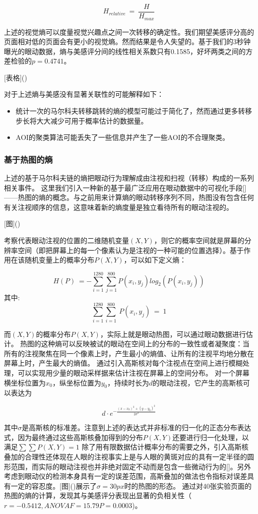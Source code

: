 $$H_{relative}~=~\frac{H}{H_{max}}$$

上述的视觉熵可以度量视觉兴趣点之间一次转移的确定性。我们期望美感评分高的页面相对低的页面会有更小的视觉熵。然而结果是令人失望的。基于我们的3秒钟曝光的眼动数据，熵与美感评分间的线性相关系数只有0.1585，好坏两类之间的方差检验的$p=0.4741$。

[表格]()

对于上述熵与美感没有显著关联性的可能解释如下：

\begin{itemize}
  \item 统计一次的马尔科夫转移跳转的熵的模型可能过于简化了，然而通过更多转移步长将大大减少可用于概率估计的数据量。
  \item AOI的聚类算法可能丢失了一些信息并产生了一些AOI的不合理聚类。
\end{itemize}

\subsubsection{基于热图的熵}
上述的基于马尔科夫链的熵把眼动行为理解成由注视和扫视（转移）构成的一系列相关事件。
这里我们引入一种新的基于最广泛应用在眼动数据中的可视化手段[]——热图的熵的概念。与之前用来计算熵的眼动转移序列不同，热图没有包含任何有关注视顺序的信息，这意味着新的熵度量是独立看待所有的眼动注视的。

[图]()

考察代表眼动注视的位置的二维随机变量$(X, Y)$，则它的概率空间就是屏幕的分辨率空间（即把屏幕上的每一个像素认为是注视的一种可能的位置选择）。基于作用在该随机变量上的概率分布$P(X, Y)$，可以如下定义熵：

$$H(P)~=-\sum_{i=1}^{1280} \sum_{j=1}^{800} P(x_i, y_j)log_2(P(x_i, y_j))$$
其中: $$\sum_{i=1}^{1280}\sum_{i=1}^{800}~P(x_i, y_j)~=~1$$

而$(X, Y)$的概率分布$P(X, Y)$，实际上就是眼动热图，可以通过眼动数据进行估计。
热图的这种熵可以反映被试的眼动在空间上的分布的一致性或者凝聚度：当所有的注视聚焦在同一个像素上时，产生最小的熵值、让所有的注视平均地分散在屏幕上时，产生最大的熵值。
通过引入高斯核对每个注视点在空间上进行模糊处理，可以实现用少量的眼动采样据来估计注视在屏幕上的空间分布。
对一个屏幕横坐标位置为$x_0$，纵坐标位置为$y_0$，持续时长为$d$的眼动注视，它产生的高斯核可以表达为

$$d\cdot e^{-\frac{(x-x_0)^2 + (y-y_0)^2}{2\sigma^2}}$$

其中$\sigma$是高斯核的标准差。注意到上述的表达式并非标准的归一化的正态分布表达式，因为最终通过这些高斯核叠加得到的分布$P(X, Y)$还要进行归一化处理，以满足$\sum\sum P(X, Y) = 1$
除了用有限数据估计概率分布的需要之外，引入高斯核叠加的合理性还体现在人眼的注视事实上是与人眼的黄斑对应的具有一定半径的圆形范围，而实际的眼动注视也并非绝对固定不动而是包含一些微动行为的[]。另外考虑到眼动仪的检测本身具有一定的误差范围，高斯叠加的做法也令指标对误差具有一定的容忍度。[图]()展示了$\sigma=30px$时的热图的形态。
通过对40张实验页面的热图的熵的计算，发现其与美感评分表现出显著的负相关性（$r = -0.5412, ANOVA F = 15.79 P = 0.0003$)。

